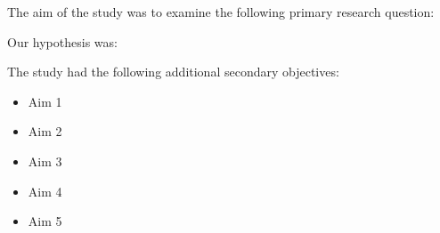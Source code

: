 
The aim of the study was to examine the following primary research question:



Our hypothesis was:



The study had the following additional secondary objectives:

\begin{itemize}
\item Aim 1
\item Aim 2
\item Aim 3
\item Aim 4
\item Aim 5
\end{itemize}

